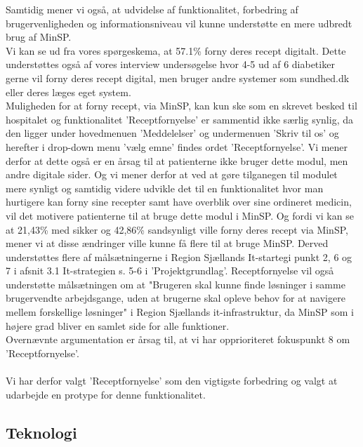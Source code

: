 Samtidig mener vi også, at udvidelse af funktionalitet, forbedring af brugervenligheden og informationsniveau vil kunne understøtte en mere udbredt brug af MinSP.\\
Vi kan se ud fra vores spørgeskema, at 57.1\% forny deres recept digitalt. Dette understøttes også af vores interview undersøgelse hvor 4-5 ud af 6 diabetiker gerne vil forny deres recept digital, men bruger andre systemer som sundhed.dk eller deres læges eget system.\\
Muligheden for at forny recept, via MinSP, kan kun ske som en skrevet besked til hospitalet og funktionalitet 'Receptfornyelse' er sammentid ikke særlig synlig, da den ligger under hovedmenuen 'Meddelelser' og undermenuen 'Skriv til os' og herefter i drop-down menu 'vælg emne' findes ordet 'Receptfornyelse'. Vi mener derfor at dette også er en årsag til at patienterne ikke bruger dette modul, men andre digitale sider. Og vi mener derfor at ved at gøre tilganegen til modulet mere synligt og samtidig videre udvikle det til en funktionalitet hvor man hurtigere kan forny sine recepter samt have overblik over sine ordineret medicin, vil det motivere patienterne til at bruge dette modul i MinSP. Og fordi vi kan se at 21,43\% med sikker og 42,86\% sandsynligt ville forny deres recept via MinSP, mener vi at disse ændringer ville kunne få flere til at bruge MinSP. Derved understøttes flere af målsætningerne i Region Sjællands It-startegi punkt 2, 6 og 7 i afsnit 3.1 It-strategien s. 5-6 i 'Projektgrundlag'. Receptfornyelse vil også understøtte målsætningen om at "Brugeren skal kunne finde løsninger i samme brugervendte arbejdsgange, uden at brugerne skal opleve behov for at navigere mellem forskellige løsninger" i Region Sjællands it-infrastruktur, da MinSP som i højere grad bliver en samlet side for alle funktioner. \\ 
Overnævnte argumentation er årsag til, at vi har opprioriteret fokuspunkt 8 om 'Receptfornyelse'. 
\\\\
Vi har derfor valgt 'Receptfornyelse' som den vigtigste forbedring og valgt at udarbejde en protype for denne funktionalitet. 
\subsection{Teknologi}
%
%
